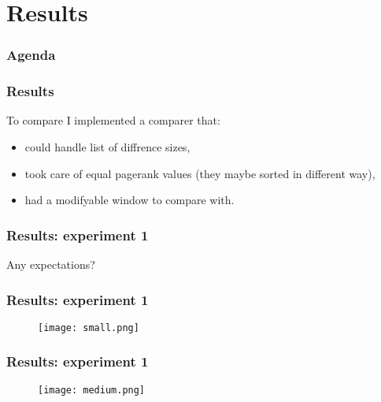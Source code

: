 \section{Results}

\begin{frame}
\frametitle{Agenda}
\tableofcontents[currentsection]
\end{frame}

\begin{frame}
\frametitle{Results}
To compare I implemented a comparer that:
\begin{itemize}
	\item could handle list of diffrence sizes,
	\item took care of equal pagerank values (they maybe sorted in different way),
	\item had a modifyable window to compare with.
\end{itemize}
\end{frame}

\begin{frame}
\frametitle{Results: experiment 1}
\LARGE Any expectations?
\end{frame}

\begin{frame}
\frametitle{Results: experiment 1}
\begin{figure}

	\texttt{[image: small.png]}

\end{figure}
\end{frame}

\begin{frame}
\frametitle{Results: experiment 1}
\begin{figure}

	\texttt{[image: medium.png]}

\end{figure}
\end{frame}

